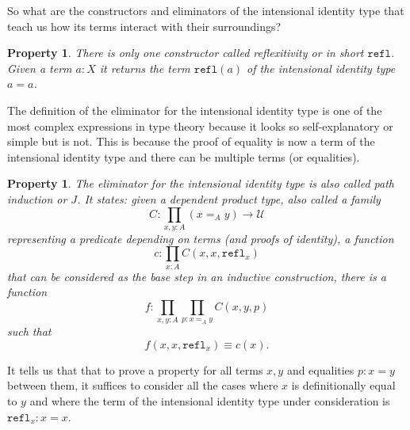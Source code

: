 \documentclass[12pt,a4paper,twoside,xetex]{book}
\newcommand{\keyword}[1]{\emph{#1}\index{#1}}
\newtheorem{property}[theorem]{Property}
\newcommand{\op}[1]{\mathtt{#1}}
\begin{document}
 So what are the constructors and eliminators of the intensional identity type that teach us how its terms interact with their surroundings?

\begin{property}\label{reflprop}
There is only one constructor called \keyword{reflexitivity} or in short $\op{refl}$. Given a term $a:X$ it returns the term $\op{refl}(a)$ of the intensional identity type  $a = a$. 
\end{property}

The definition of the eliminator for the intensional identity type is one of the most complex expressions in type theory because it looks so self-explanatory or simple but is not. This is because the proof of equality is now a term of the intensional identity type and there can be multiple terms (or equalities). 

\begin{property}\label{pathindprop}
The eliminator for the intensional identity type is also called \keyword{path induction} or $J$. It states: given a dependent product type, also called a family
$$C : \prod_{x,y:A} (x =_A y) \rightarrow \mathcal{U}$$
representing a predicate depending on terms (and proofs of identity), a function $$c:\prod_{x:A} C(x,x,\op{refl}_x)$$ that can be considered as the base step in an inductive construction, there is a function $$f: \prod_{x,y:A} \prod_{p:x=_Ay}C(x,y,p)$$ such that $$f(x,x,\op{refl}_x) \equiv c(x).$$
\end{property}


It tells us that that to prove a property for all terms $x,y$ and equalities $p:x=y$ between them, it suffices to consider all the cases where $x$ is definitionally equal to $y$ and where the term of the intensional identity type under consideration is $\op{refl}_x : x = x$.




\end{document}
